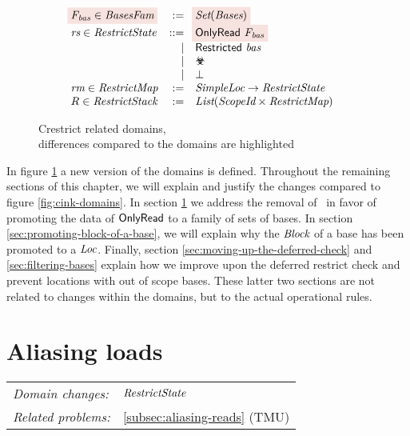 \begin{figure}[htb]
\[\begin{array}{lrll}
\highlightchangem{\Basesfamvar \in \Basesfam}
                                            &   :=          & \highlightchangem{\Set{\Bases}}                                             & \\
\Restrictstatevar \in \Restrictstate        &   \bnfdef     & \highlightchangem{\onlyread{\Basesfamvar}}                                 & \\
                                            &   |           & \restricted{\Basesvar}                                     & \\
                                            &   |           & \rsub                                                           & \\
                                            &   |           & \bot                                                            & \\
\Restrictmapvar \in \Restrictmap            &   :=          & \Simpleloc \rightarrow \Restrictstate                           & \\
R \in \Restrictstack                        &   :=          & \List{\Scopeid \times \Restrictmap}    
\end{array}
\]
\caption{Crestrict related domains, \\ differences compared to the \cink{} domains are highlighted}
\label{fig:cink-domains2}
\end{figure}

In figure \ref{fig:cink-domains2} a new version of the \cink{} domains is defined.
Throughout the remaining sections of this chapter, we will explain and justify the changes compared to figure \ref{fig:cink-domains}.
In section \ref{sec:substituting-unrestricted} we address the removal of \unrestricted \ in favor of promoting the data of $\mathsf{OnlyRead}$ to a family of sets of bases.
In section \ref{sec:promoting-block-of-a-base}, we will explain why the $\textit{Block}$ of a base has been promoted to a $\textit{Loc}$.
Finally, section \ref{sec:moving-up-the-deferred-check} and \ref{sec:filtering-bases} explain how we improve upon the deferred restrict check
and prevent locations with out of scope bases.
These latter two sections are not related to changes within the domains, but to the actual operational rules.

\newpage

\section{Aliasing loads}\label{sec:substituting-unrestricted}
\vspace*{-\baselineskip}
\begin{table}[htp]
\begin{tabular}{ll}
\textit{Domain changes:}   &  $\textit{RestrictState}$ \\
\textit{Related problems:} & \ref{subsec:aliasing-reads} (TMU)    \\
\end{tabular}
\end{table}

